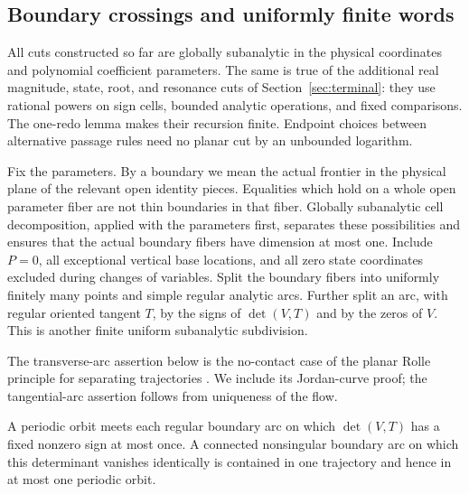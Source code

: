 \subsection{Boundary crossings and uniformly finite words}

All cuts constructed so far are globally subanalytic in the physical
coordinates and polynomial coefficient parameters.  The same is true
of the additional real magnitude, state, root, and resonance cuts of
Section~\ref{sec:terminal}: they use rational powers on sign cells,
bounded analytic operations, and fixed comparisons.  The one-redo
lemma makes their recursion finite.  Endpoint choices between
alternative passage rules need no planar cut by an unbounded logarithm.

Fix the parameters.  By a boundary we mean the actual frontier in the
physical plane of the relevant open identity pieces.  Equalities which
hold on a whole open parameter fiber are not thin boundaries in that
fiber.  Globally subanalytic cell decomposition, applied with the
parameters first, separates these possibilities and ensures that the
actual boundary fibers have dimension at most one.  Include $P=0$,
all exceptional vertical base locations, and all zero state coordinates
excluded during changes of variables.  Split the boundary fibers into
uniformly finitely many points and simple regular analytic arcs.
Further split an arc, with regular oriented tangent $T$, by the signs
of $\det(V,T)$ and by the zeros of $V$.  This is another finite uniform
subanalytic subdivision.

The transverse-arc assertion below is the no-contact case of the planar
Rolle principle for separating trajectories
\citep[Lemma~1]{Khovanskii1984Rolle}. We include its Jordan-curve proof;
the tangential-arc assertion follows from uniqueness of the flow.

\begin{lemma}
\label{lem:subdivision-crossing}
A periodic orbit meets each regular boundary arc on which
$\det(V,T)$ has a fixed nonzero sign at most once.  A connected
nonsingular boundary arc on which this determinant vanishes identically
is contained in one trajectory and hence in at most one periodic orbit.
\end{lemma}


